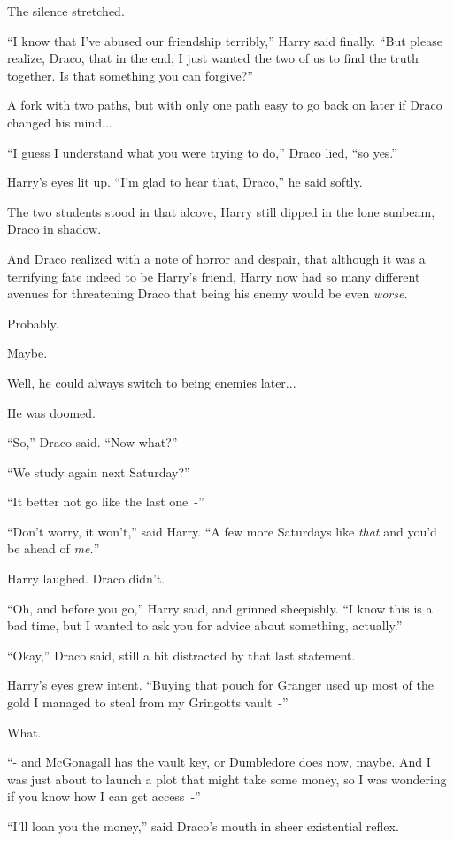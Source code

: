 The silence stretched.

``I know that I've abused our friendship terribly,'' Harry said finally. ``But please realize, Draco, that in the end, I just wanted the two of us to find the truth together. Is that something you can forgive?''

A fork with two paths, but with only one path easy to go back on later if Draco changed his mind...

``I guess I understand what you were trying to do,'' Draco lied, ``so yes.''

Harry's eyes lit up. ``I'm glad to hear that, Draco,'' he said softly.

The two students stood in that alcove, Harry still dipped in the lone sunbeam, Draco in shadow.

And Draco realized with a note of horror and despair, that although it was a terrifying fate indeed to be Harry's friend, Harry now had so many different avenues for threatening Draco that being his enemy would be even \emph{worse}.

Probably.

Maybe.

Well, he could always switch to being enemies later...

He was doomed.

``So,'' Draco said. ``Now what?''

``We study again next Saturday?''

``It better not go like the last one~-''

``Don't worry, it won't,'' said Harry. ``A few more Saturdays like \emph{that} and you'd be ahead of \emph{me.}''

Harry laughed. Draco didn't.

``Oh, and before you go,'' Harry said, and grinned sheepishly. ``I know this is a bad time, but I wanted to ask you for advice about something, actually.''

``Okay,'' Draco said, still a bit distracted by that last statement.

Harry's eyes grew intent. ``Buying that pouch for Granger used up most of the gold I managed to steal from my Gringotts vault~-''

What.

``- and McGonagall has the vault key, or Dumbledore does now, maybe. And I was just about to launch a plot that might take some money, so I was wondering if you know how I can get access~-''

``I'll loan you the money,'' said Draco's mouth in sheer existential reflex.

